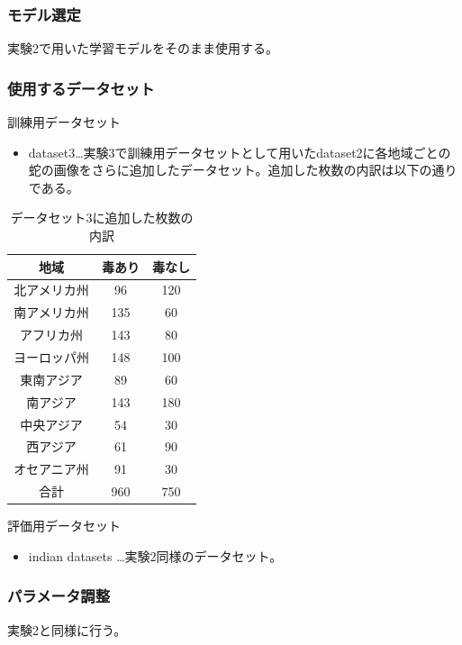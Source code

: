 \documentclass[a4paper, 11pt, titlepage]{jsarticle}
\begin{document}
\subsubsection{モデル選定}
実験2で用いた学習モデルをそのまま使用する。

\subsubsection{使用するデータセット}
訓練用データセット
\begin{itemize}
\item dataset3…実験3で訓練用データセットとして用いたdataset2に各地域ごとの蛇の画像をさらに追加したデータセット。追加した枚数の内訳は以下の通りである。
\end{itemize}\par

\clearpage

\begin{table}[htb]
\centering
  \caption{データセット3に追加した枚数の内訳}
  \begin{tabular}{|c|c|c|}  \hline
    地域 & 毒あり & 毒なし \\ \hline \hline
    北アメリカ州 & 96 & 120 \\ \hline
    南アメリカ州 & 135 & 60 \\ \hline
    アフリカ州 & 143 & 80 \\ \hline
    ヨーロッパ州 & 148 & 100 \\ \hline
    東南アジア & 89 & 60 \\ \hline
    南アジア & 143 & 180 \\ \hline
    中央アジア & 54 & 30 \\ \hline
    西アジア & 61 & 90 \\ \hline
    オセアニア州 & 91 & 30 \\ \hline \hline
    合計 & 960 & 750 \\ \hline
  \end{tabular}
\end{table}

評価用データセット
\begin{itemize}
\item indian datasets …実験2同様のデータセット。
\end{itemize}

\subsubsection{パラメータ調整}
実験2と同様に行う。
\end{document}
